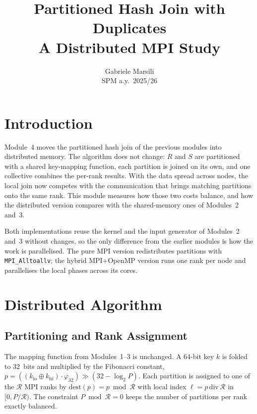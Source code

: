 \documentclass[10pt,twocolumn,a4paper]{article}
\title{\textbf{Partitioned Hash Join with Duplicates}\\\large A Distributed MPI Study}
\author{Gabriele Marsili \\ SPM a.y.\ 2025/26}
\date{}
\begin{document}
\maketitle
\thispagestyle{empty}

\section{Introduction}
Module~4 moves the partitioned hash join of the previous modules
into distributed memory. The algorithm does not change: $R$ and
$S$ are partitioned with a shared key-mapping function, each
partition is joined on its own, and one collective combines the
per-rank results. With the data spread across nodes, the local
join now competes with the communication that brings matching
partitions onto the same rank. This module measures how those two
costs balance, and how the distributed version compares with the
shared-memory ones of Modules~2 and~3.

Both implementations reuse the kernel and the input
generator of Modules~2 and~3 without changes, so the only
difference from the earlier modules is how the work is
parallelised. The pure MPI version redistributes partitions with
\texttt{MPI\_Alltoallv}; the hybrid MPI+OpenMP version runs one
rank per node and parallelises the local phases across its cores.

\section{Distributed Algorithm}

\subsection{Partitioning and Rank Assignment}
The mapping function from Modules~1--3 is unchanged. A 64-bit key
$k$ is folded to 32~bits and multiplied by the Fibonacci constant,
$p=((k_{\text{lo}}\oplus k_{\text{hi}})\cdot\varphi_{32})\gg(32-\log_2
P)$. Each partition is assigned to one of the $\mathcal{R}$ MPI ranks by
$\text{dest}(p)=p\bmod \mathcal{R}$ with local index
$\ell=p\,\text{div}\,\mathcal{R}$ in $[0,P/\mathcal{R})$. The
constraint $P\bmod \mathcal{R}=0$ keeps the number of partitions per
rank exactly balanced.
\end{document}
